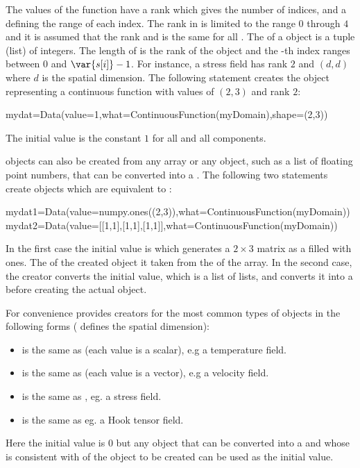 The values of the function have a rank which gives the
number of indices, and a \Shape defining the range of each index.
The rank in \escript is limited to the range $0$ through $4$ and
it is assumed that the rank and \Shape is the same for all \DataSamplePoints.
The \Shape of a \Data object is a tuple (list)  of integers. The length
of  is the rank of the \Data object and the -th index ranges between $0$ and $\var{s[i]}-1$.
For instance, a stress field has rank $2$ and 
\Shape $(d,d)$ where $d$ is the spatial dimension.
The following statement creates the \Data object
 representing a 
continuous function with values 
of \Shape $(2,3)$ and rank $2$:
\begin{python}
  mydat=Data(value=1,what=ContinuousFunction(myDomain),shape=(2,3))
\end{python}
The initial value is the constant $1$ for all \DataSamplePoints and
all components.

\Data objects can also be created from any \numpy
array or any object, such as a list of floating point numbers, 
that can be converted into a \numpyNDA \cite{NUMPY}. 
The following two statements
create objects which are equivalent to :
\begin{python}
  mydat1=Data(value=numpy.ones((2,3)),what=ContinuousFunction(myDomain))
  mydat2=Data(value=[[1,1],[1,1],[1,1]],what=ContinuousFunction(myDomain))
\end{python}
In the first case the initial value is 
which generates a $2 \times 3$ matrix as a \numpyNDA
filled with ones. The \Shape of the created \Data object
it taken from the \Shape of the array. In the second
case, the creator converts the initial value, which is a list of lists,
and converts it into a \numpyNDA before creating the actual
\Data object.      

For convenience \escript provides creators for the most common types
of \Data objects in the following forms ( defines the 
spatial dimension):
\begin{itemize}
\item {} is the same as  (each value is a scalar), 
e.g a temperature field. 
\item {} is the same as  (each value is a vector), e.g
a velocity field.   
\item {} is the same as ,
eg. a stress field.  
\item {} is the same as 
eg. a Hook tensor field.   
\end{itemize}
Here the initial value is $0$ but any object that can be converted into a \numpyNDA and whose \Shape
is consistent with \Shape of the \Data object to be created can be used as the initial value.

